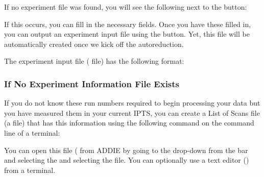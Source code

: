 If no experiment file was found, you will see the following next to the  button:

  \noindent{}
  
If this occurs, you can fill in the necessary fields. Once you have these filled in, you can output an experiment input file using the  button. Yet, this file will be automatically created once we kick off the autoreduction. 

The experiment input file ( file) has the following format:

  \noindent{}

\subsubsection{If No Experiment Information File Exists}

If you do not know these run numbers required to begin processing your data but you have measured them in your current IPTS, you can create a List of Scans file (a  file) that has this information using the following command on the command line of a terminal:


You can open this file ( from ADDIE by going to the  drop-down from the  bar and selecting the  and selecting the  file. You can optionally use a text editor () from a terminal.

